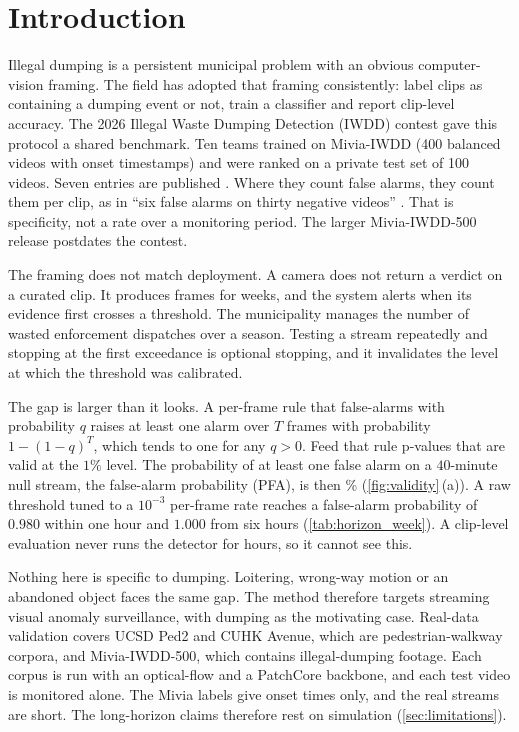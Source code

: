 \section{Introduction}
\label{sec:intro}

Illegal dumping is a persistent municipal problem with an obvious
computer-vision framing. The field has adopted that framing consistently: label
clips as containing a dumping event or not, train a classifier and report
clip-level accuracy. The 2026 Illegal Waste Dumping Detection (IWDD) contest \citep{bouwmans2026overview} gave this
protocol a shared benchmark. Ten teams trained on Mivia-IWDD (400 balanced
videos with onset timestamps) and were ranked on a private test set of 100 videos.
Seven entries are published
\citep{almorsy2026x3d,kim2026kfold,scarrica2026garberus,kairanbay2026vlm,zbuce2026novelty,bhat2026imslab,putzu2026unicass}.
Where they count false alarms, they count them per clip, as in ``six false alarms
on thirty negative videos'' \citep{almorsy2026x3d}. That is specificity, not a
rate over a monitoring period. The larger Mivia-IWDD-500 release
\citep{greco2026iwdd} postdates the contest.

The framing does not match deployment. A camera does not return a verdict on a
curated clip. It produces frames for weeks, and the system alerts when its
evidence first crosses a threshold. The municipality manages the number of wasted
enforcement dispatches over a season. Testing a stream repeatedly and stopping at
the first exceedance is optional stopping, and it invalidates the level at which
the threshold was calibrated.

The gap is larger than it looks. A per-frame rule that false-alarms with
probability $q$ raises at least one alarm over $T$ frames with probability
$1-(1-q)^{T}$, which tends to one for any $q>0$. Feed that rule p-values that are
valid at the $1\%$ level. The probability of at least one false alarm on a $40$-minute null stream, the false-alarm probability (PFA), is then \ValidityPfaPvaluePct\% (\cref{fig:validity}\,(a)). A
raw threshold tuned to a $10^{-3}$ per-frame rate reaches a false-alarm probability
of $0.980$ within one hour and $1.000$ from six hours (\cref{tab:horizon_week}). A
clip-level evaluation never runs the detector for hours, so it cannot see this.

Nothing here is specific to dumping. Loitering, wrong-way motion or an abandoned
object faces the same gap. The method therefore targets streaming visual anomaly
surveillance, with dumping as the motivating case. Real-data validation covers UCSD
Ped2 and CUHK Avenue, which are pedestrian-walkway corpora, and Mivia-IWDD-500,
which contains illegal-dumping footage. Each corpus is run with an optical-flow and
a PatchCore backbone, and each test video is monitored alone. The Mivia labels give
onset times only, and the real streams are short. The long-horizon claims therefore
rest on simulation (\cref{sec:limitations}).

